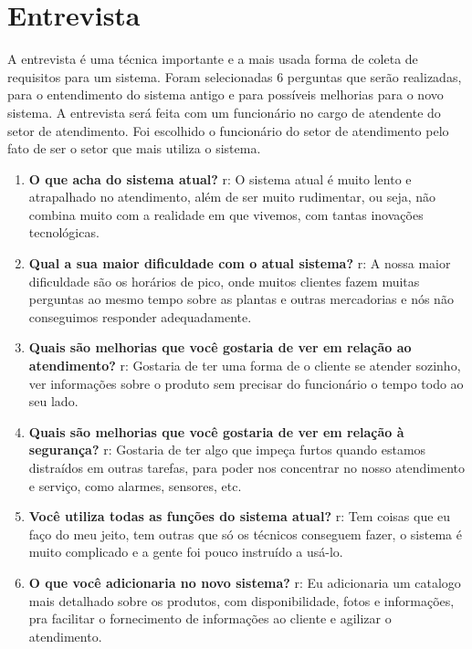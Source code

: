 \section{Entrevista}

A entrevista é uma técnica importante e a mais usada forma de coleta de requisitos para um sistema. Foram selecionadas 6 perguntas que serão realizadas, para o entendimento do sistema antigo e para possíveis melhorias para o novo sistema. A entrevista será feita com um funcionário no cargo de atendente do setor de atendimento. Foi escolhido o funcionário do setor de atendimento pelo fato de ser o setor que mais utiliza o sistema.

\begin{enumerate}
	\item \textbf{O que acha do sistema atual?}
		\subitem r: O sistema atual é muito lento e atrapalhado no atendimento, além de ser muito rudimentar, ou seja, não combina muito com a realidade em que vivemos, com tantas inovações tecnológicas. 
	\item \textbf{Qual a sua maior dificuldade com o atual sistema?}
		\subitem r: A nossa maior dificuldade são os horários de pico, onde muitos clientes fazem muitas perguntas ao mesmo tempo sobre as plantas e outras mercadorias e nós não conseguimos responder adequadamente.
	\item \textbf{Quais são melhorias que você gostaria de ver em relação ao atendimento?}
		\subitem r: Gostaria de ter uma forma de o cliente se atender sozinho, ver informações sobre o produto sem precisar do funcionário o tempo todo ao seu lado.
	\item \textbf{Quais são melhorias que você gostaria de ver em relação à segurança?}
		\subitem r: Gostaria de ter algo que impeça furtos quando estamos distraídos em outras tarefas, para poder nos concentrar no nosso atendimento e serviço, como alarmes, sensores, etc. 
	\item \textbf{Você utiliza todas as funções do sistema atual?}
		\subitem r: Tem coisas que eu faço do meu jeito, tem outras que só os técnicos conseguem fazer, o sistema é muito complicado e a gente foi pouco instruído a usá-lo.
	\item \textbf{O que você adicionaria no novo sistema?}
		\subitem r: Eu adicionaria um catalogo mais detalhado sobre os produtos, com disponibilidade, fotos e informações, pra facilitar o fornecimento de informações ao cliente e agilizar o atendimento.
\end{enumerate}

